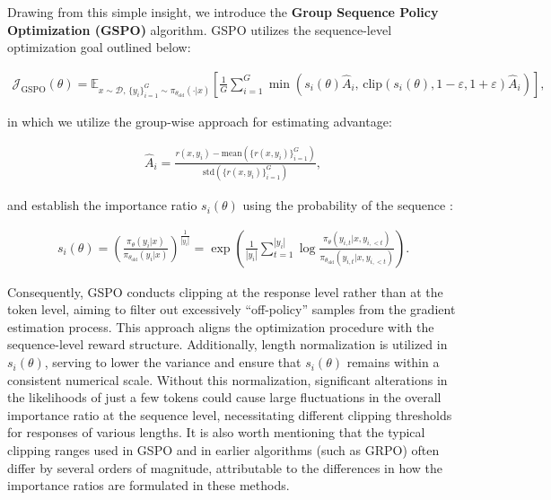 Drawing from this simple insight, we introduce the \textbf{Group Sequence Policy Optimization (GSPO)} algorithm. GSPO utilizes the sequence-level optimization goal outlined below:

\begin{align}
\mathcal{J}_\text{GSPO} (\theta) =
\mathbb{E}_{ x \sim \mathcal{D},\, \{y_i\}_{i=1}^G \sim \pi_{\theta_\text{old}}( \cdot | x) }
\left[ 
\frac{1}{G} \sum_{i=1}^{G}
\min \left( s_{i}(\theta)  \widehat{A}_{i},  \, \mathrm{clip} \left( s_{i}(\theta), 1 - {\varepsilon}, 1 + {\varepsilon} \right) \widehat{A}_{i} \right) 
\right],
\label{equ:gspo}
\end{align}

in which we utilize the group-wise approach for estimating advantage:

\begin{align}
\widehat{A}_{i} = \frac{r(x, y_i) - \mathrm{mean} \left( \{ r(x, y_i) \}_{i=1}^G \right) }{ \mathrm{std} \left( \{ r(x, y_i) \}_{i=1}^G \right) },
\end{align}

and establish the importance ratio $s_{i}(\theta)$ using the probability of the sequence \citep{click}:

\begin{align}
s_{i}(\theta) = \left( \frac{ \pi_{\theta} (y_i | x) }{ \pi_{\theta_\text{old}} (y_i | x)} \right)^{\frac{1}{|y_i|}}
=
\exp \left( \frac{1}{|y_i|} \sum_{t=1}^{|y_i|} \log \frac{ \pi_{\theta} (y_{i,t} | x, y_{i,<t}) }{ \pi_{\theta_\text{old}} (y_{i,t} | x,y_{i,<t})} \right).
\end{align}

Consequently, GSPO conducts clipping at the response level rather than at the token level, aiming to filter out excessively ``off-policy'' samples from the gradient estimation process. This approach aligns the optimization procedure with the sequence-level reward structure. Additionally, length normalization is utilized in $s_{i}(\theta)$, serving to lower the variance and ensure that $s_{i}(\theta)$ remains within a consistent numerical scale. Without this normalization, significant alterations in the likelihoods of just a few tokens could cause large fluctuations in the overall importance ratio at the sequence level, necessitating different clipping thresholds for responses of various lengths. It is also worth mentioning that the typical clipping ranges used in GSPO and in earlier algorithms (such as GRPO) often differ by several orders of magnitude, attributable to the differences in how the importance ratios are formulated in these methods.

